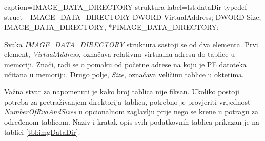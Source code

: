 \documentclass[times, utf8, diplomski, numeric]{fer}
\begin{document}
\begin{struktura} {caption=IMAGE\_DATA\_DIRECTORY struktura} {label=lst:dataDir}
typedef struct _IMAGE_DATA_DIRECTORY {
	DWORD   VirtualAddress;
	DWORD   Size;
} IMAGE_DATA_DIRECTORY, *PIMAGE_DATA_DIRECTORY;
\end{struktura}

Svaka \emph{IMAGE\_DATA\_DIRECTORY} struktura sastoji se od dva
elementa. Prvi element, \emph{VirtualAddress}, označava relativnu
virtualnu adresu do tablice u memoriji. Znači, radi se o pomaku
od početne adrese na koju je PE datoteka učitana u memoriju.
Drugo polje, \emph{Size}, označava veličinu tablice u oktetima.

Važna stvar za napomenuti je kako broj tablica nije fiksan.
Ukoliko postoji potreba za pretraživanjem direktorija tablica,
potrebno je provjeriti vrijednost \emph{NumberOfRvaAndSizes} u
opcionalnom zaglavlju prije nego se krene u potragu za određenom
tablicom. Naziv i kratak opis svih podatkovnih tablica prikazan
je na tablici \ref{tbl:imgDataDir}.
\end{document}
